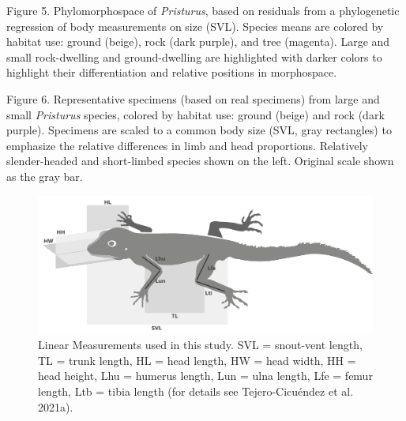 \documentclass[
  11pt,
]{article}
\begin{document}
Figure 5. Phylomorphospace of \emph{Pristurus}, based on residuals from
a phylogenetic regression of body measurements on size (SVL). Species
means are colored by habitat use: ground (beige), rock (dark purple),
and tree (magenta). Large and small rock-dwelling and ground-dwelling
are highlighted with darker colors to highlight their differentiation
and relative positions in morphospace.

Figure 6. Representative specimens (based on real specimens) from large
and small \textit{Pristurus} species, colored by habitat use: ground
(beige) and rock (dark purple). Specimens are scaled to a common body
size (SVL, gray rectangles) to emphasize the relative differences in
limb and head proportions. Relatively slender-headed and short-limbed
species shown on the left. Original scale shown as the gray bar.

\newpage

\begin{figure}

{\centering \includegraphics[width=1\linewidth]{Figs/Fig1} 

}

\caption{Linear Measurements used in this study. SVL = snout-vent length, TL = trunk length, HL = head length, HW = head width, HH = head height, Lhu = humerus length, Lun = ulna length, Lfe = femur length, Ltb = tibia length (for details see Tejero-Cicu{\'{e}}ndez et al. 2021a).}\label{fig:unnamed-chunk-4}
\end{figure}

\newpage
\end{document}
